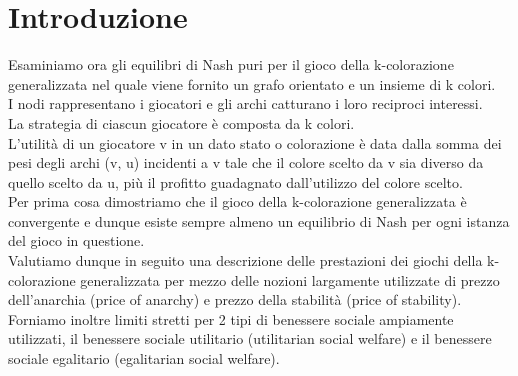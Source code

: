 \chapter{Introduzione}
\justify
Esaminiamo ora gli equilibri di Nash puri per il gioco della k-colorazione generalizzata nel quale viene fornito un grafo orientato e un insieme di k colori.\\
I nodi rappresentano i giocatori e gli archi catturano i loro reciproci interessi.\\
La strategia di ciascun giocatore è composta da k colori.\\
L'utilità di un giocatore v in un dato stato o colorazione è data dalla somma dei pesi degli archi (v, u) incidenti a v tale che il colore scelto da v sia diverso da quello scelto da u, più il profitto guadagnato dall'utilizzo del colore scelto.\\
Per prima cosa dimostriamo che il gioco della k-colorazione generalizzata è convergente e dunque esiste sempre almeno un equilibrio di Nash per ogni istanza del gioco in questione.\\
Valutiamo dunque in seguito una descrizione delle prestazioni dei giochi della k-colorazione generalizzata per mezzo delle nozioni largamente utilizzate di prezzo dell'anarchia (price of anarchy) e prezzo della stabilità (price of stability).\\
Forniamo inoltre limiti stretti per 2 tipi di benessere sociale ampiamente utilizzati, il benessere sociale utilitario (utilitarian social welfare) e il benessere sociale egalitario (egalitarian social welfare).\newline


